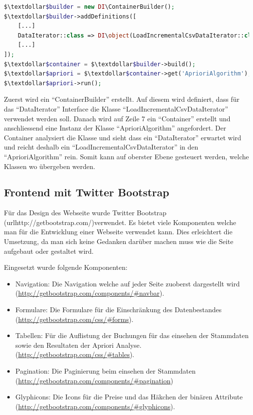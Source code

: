 \begin{lstlisting}[language=php]
$\textdollar$builder = new DI\ContainerBuilder();
$\textdollar$builder->addDefinitions([
    [...]
    DataIterator::class => DI\object(LoadIncrementalCsvDataIterator::class),
    [...]
]);
$\textdollar$container = $\textdollar$builder->build();
$\textdollar$apriori = $\textdollar$container->get('AprioriAlgorithm');
$\textdollar$apriori->run();
\end{lstlisting}

Zuerst wird ein "`ContainerBuilder"' erstellt. Auf diesem wird definiert, dass für das "`DataIterator"' Interface die Klasse "`LoadIncrementalCsvDataIterator"' verwendet werden soll. Danach wird auf Zeile 7 ein "`Container"' erstellt und anschliessend eine Instanz der Klasse "`AprioriAlgorithm"' angefordert. Der Container analysiert die Klasse und sieht dass ein "`DataIterator"' erwartet wird und reicht deshalb ein "`LoadIncrementalCsvDataIterator"' in den "`AprioriAlgorithm"' rein. Somit kann auf oberster Ebene gesteuert werden, welche Klassen wo übergeben werden.

\subsection{Frontend mit Twitter Bootstrap}
\label{sec:proofofconcept:externebibliotheken:bootstrap}
Für das Design des Webseite wurde Twitter Bootstrap (url{http://getbootstrap.com/})verwendet. Es bietet viele Komponenten welche man für die Entwicklung einer Webseite verwendet kann. Dies erleichtert die Umsetzung, da man sich keine Gedanken darüber machen muss wie die Seite aufgebaut oder gestaltet wird. 

Eingesetzt wurde folgende Komponenten:
\begin{itemize}
	\item Navigation: Die Navigation welche auf jeder Seite zuoberst dargestellt wird (\url{http://getbootstrap.com/components/#navbar}).
	\item Formulare: Die Formulare für die Einschränkung des Datenbestandes (\url{http://getbootstrap.com/css/#forms}).
	\item Tabellen: Für die Auflistung der Buchungen für das einsehen der Stammdaten sowie den Resultaten der Apriori Analyse. (\url{http://getbootstrap.com/css/#tables}).
	\item Pagination: Die Paginierung beim einsehen der Stammdaten (\url{http://getbootstrap.com/components/#pagination})
	\item Glyphicons: Die Icons für die Preise und das Häkchen der binären Attribute (\url{http://getbootstrap.com/components/#glyphicons}).
\end{itemize}

